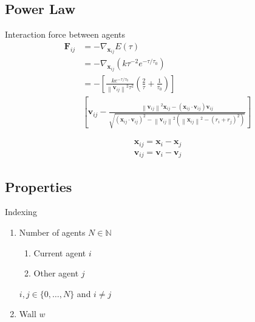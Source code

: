\subsection{Power Law}
Interaction force between agents
\begin{align}
\mathbf{F}_{ij} &= -\nabla_{\mathbf{x}_{ij}} E(\tau) \\
&= -\nabla_{\mathbf{x}_{ij}} \left(k \tau^{-2} e^{-\tau / \tau_{0}} \right)
\\
&= - \left[\frac{k e^{-\tau / \tau_{0}}}{\left\|\mathbf{v}_{ij}\right\|^{2} \tau^{2}} \left(\frac{2}{\tau} + \frac{1}{\tau_{0}}\right) \right] 
\\
&\left[ \mathbf{v}_{ij} - \frac{\left\|\mathbf{v}_{ij}\right\|^{2} \mathbf{x}_{ij} - \left(\mathbf{x}_{ij}\cdot\mathbf{v}_{ij}\right) \mathbf{v}_{ij} }{\sqrt{\left(\mathbf{x}_{ij}\cdot\mathbf{v}_{ij}\right)^{2} - \left\|\mathbf{v}_{ij}\right\|^{2} \left( \left\|\mathbf{x}_{ij}\right\|^{2} - \left(r_{i} + r_{j}\right)^{2} \right) }} \right]
\end{align}

\begin{align}
\mathbf{x}_{ij} = \mathbf{x}_{i} - \mathbf{x}_{j} \\
\mathbf{v}_{ij} = \mathbf{v}_{i} - \mathbf{v}_{j}
\end{align}

\subsection{Properties}
Indexing
\begin{enumerate}
\item Number of agents $ N \in \mathbb{N} $
\begin{enumerate}
\item Current agent $ i $
\item Other agent $ j $
\end{enumerate}
$ i,j \in \{0, \ldots, N\} $ and $ i \neq j $

\item 
Wall $ w $

\end{enumerate}

